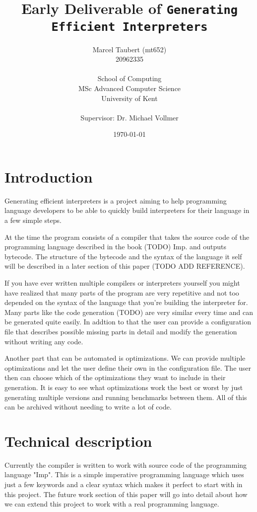 \documentclass{article}
\title{Early Deliverable of \texttt{Generating Efficient Interpreters}}
\author{
    Marcel Taubert  (mt652)\\
    20962335        \\
    \\
    School of Computing \\
    MSc Advanced Computer Science\\
    University of Kent \\
    \\
    Supervisor: Dr. Michael Vollmer
}
\date{\today}
\begin{document}
\maketitle
\clearpage

\section{Introduction}
Generating efficient interpreters is a project aiming to help programming
language developers to be able to quickly build interpreters for their language
in a few simple steps.

At the time the program consists of a compiler that takes the source code of
the programming language described in the book (TODO) Imp.
and outputs bytecode. The structure of the bytecode and the syntax of the
language it self will be described in a later section of this paper (TODO ADD REFERENCE).

If you have ever written multiple compilers or interpreters yourself you might
have realized that many parts of the program are very repetitive and not too
depended on the syntax of the language that you're building the interpreter
for. Many parts like the code generation (TODO) are very similar every time and
can be generated quite easily. In addtion to that the user can provide a
configuration file that describes possible missing parts in detail and modify
the generation without writing any code.

Another part that can be automated is optimizations. We can provide multiple
optimizations and let the user define their own in the configuration file. The
user then can choose which of the optimizations they want to include in their
generation. It is easy to see what optimizations work the best or worst by just
generating multiple versions and running benchmarks between them. All of this
can be archived without needing to write a lot of code.

\section{Technical description} 
Currently the compiler is written to work with source code of the programming
language "Imp". This is a simple imperative programming language which uses
just a few keywords and a clear syntax which makes it perfect to start with in
this project. The future work section of this paper will go into detail about
how we can extend this project to work with a real programming language.
\end{document}
